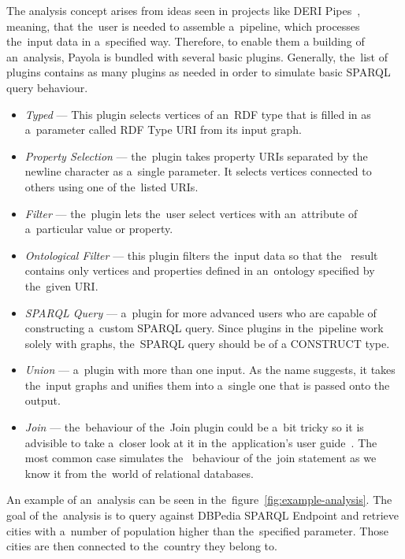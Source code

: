 The analysis concept arises from ideas seen in projects like DERI 
Pipes~\cite{deri-pipes}, meaning, that the~user is needed to assemble a~pipeline,
which processes the~input data in a~specified way. Therefore, to enable them a 
building of an~analysis, Payola is bundled with several basic 
plugins. Generally, the~list of plugins contains as many plugins as needed
in order to simulate basic SPARQL query behaviour.

\begin{itemize}
  \item \emph{Typed} --- This plugin selects vertices of an~RDF type that is filled in
  as a~parameter called RDF Type URI from its input graph.
  
  \item \emph{Property Selection} --- the~plugin takes property URIs separated by the
  newline character as a~single parameter. It selects vertices connected
  to others using one of the~listed URIs.
  
  \item \emph{Filter} --- the~plugin lets the~user select vertices with an~attribute of
  a~particular value or property.
 
  \item \emph{Ontological Filter} --- this plugin filters the~input data so that the~
  result contains only vertices and properties defined in an~ontology specified 
  by the~given URI.
  
  \item \emph{SPARQL Query} --- a~plugin for more advanced users who are capable of 
  constructing a~custom SPARQL query. Since plugins in the~pipeline work solely with 
  graphs, the~SPARQL query should be of a CONSTRUCT type.
  
  \item \emph{Union} --- a~plugin with more than one input. As the name suggests, it takes 
  the~input graphs and unifies them into a~single one that is passed onto the~
  output.
  
  \item \emph{Join} --- the~behaviour of the~Join plugin could be a~bit tricky so it is advisible
  to take a~closer look at it in the~application's 
  user guide~\cite{payola:ug:join-plugin}. The most common case simulates the~
  behaviour of the~join statement as we know it from the~world of relational 
  databases.
  
\end{itemize}

An example of an~analysis can be seen in the~figure~\ref{fig:example-analysis}.
The goal of the~analysis is to query against DBPedia SPARQL Endpoint and 
retrieve cities with a~number of population higher than the~specified parameter. 
Those cities are then connected to the~country they belong to.

